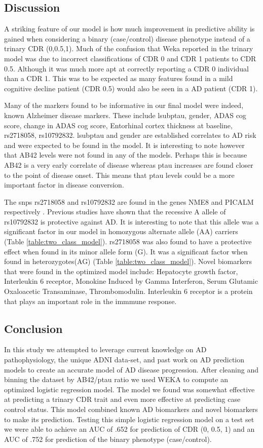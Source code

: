 \documentclass[10pt]{article}
\begin{document}
\subsection*{Discussion}

A striking feature of our model is how much improvement in predictive ability is gained when considering a binary (case/control) disease phenotype instead of a trinary CDR (0,0.5,1).  Much of the confusion that Weka reported in the trinary model was due to incorrect classifications of CDR 0 and CDR 1 patients to CDR 0.5.  Although it was much more apt at correctly reporting a CDR 0 individual than a CDR 1.  This was to be expected as many features found in a mild cognitive decline patient (CDR 0.5) would also be seen in a AD patient (CDR 1).

Many of the markers found to be informative in our final model were indeed, known Alzheimer disease markers.  These include lsubptau, gender, ADAS cog score, change in ADAS cog score, Entorhinal cortex thickness at baseline, rs2718058, rs10792832.  lsubptau and gender are established correlates to AD risk and were expected to be found in the model.  It is interesting to note however that AB42 levels were not found in any of the models.  Perhaps this is because AB42 is a very early correlate of disease whereas ptau increases are found closer to the point of disease onset.  This means that ptau levels could be a more important factor in disease conversion.

The snps rs2718058 and rs10792832 are found in the genes NME8 and PICALM respectively .  Previous studies have shown that the recessive A allele of rs10792832 is protective against AD.  It is interesting to note that this allele was a significant factor in our model in homozygous alternate allele (AA) carriers (Table \ref{table:two_class_model}).  rs2718058 was also found to have a protective effect when found in its minor allele form (G).  It was a significant factor when found in heterozygotes(AG) (Table \ref{table:two_class_model}).  Novel biomarkers that were found in the optimized model include: Hepatocyte growth factor, Interleukin 6 receptor, Monokine Induced by Gamma Interferon, Serum Glutamic Oxaloacetic Transaminase, Thrombomodulin.  Interleukin 6 receptor is a protein that plays an important role in the immmune response.

\subsection*{Conclusion}
In this study we attempted to leverage current knowledge on AD pathophysiology, the unique ADNI data-set, and past work on AD prediction models to create an accurate model of AD disease progression.  After cleaning and binning the dataset by AB42/ptau ratio we used WEKA to compute an optimized logistic regression model.  The model we found was somewhat effective at predicting a trinary CDR trait and even more effective at predicting case control status.  This model combined known AD biomarkers and novel biomarkers to make its prediction.  Testing this simple logistic regression model on a test set we were able to achieve an AUC of .652 for prediction of CDR (0, 0.5, 1) and an AUC of .752 for prediction of the binary phenotype (case/control).
\end{document}
